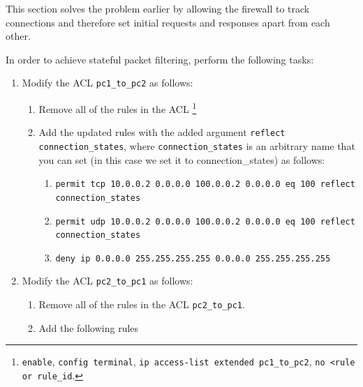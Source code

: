 \documentclass[pdftex,12pt,a4paper]{article}
\begin{document}
            This section solves the problem earlier by allowing the firewall to
            track connections and therefore set initial requests and responses
            apart from each other.

            In order to achieve stateful packet filtering, perform the
            following tasks:
            \begin{enumerate}
                \item Modify the ACL \texttt{pc1\_to\_pc2} as follows:
                    \begin{enumerate}
                        \item Remove all of the rules in the ACL
                            \footnote{\texttt{enable}, \texttt{config
                                terminal}, \texttt{ip access-list extended
                            pc1\_to\_pc2}, \texttt{no <rule or rule\_id}.}
                        \item Add the updated rules with the added argument
                            \texttt{reflect connection\_states}, where
                            \texttt{connection\_states} is an arbitrary name
                            that you can set (in this case we set it to
                            connection\_states) as follows:
                            \begin{enumerate}
                                \item  \texttt{permit tcp 10.0.0.2 0.0.0.0
                                    100.0.0.2 0.0.0.0 eq 100 reflect
                                    connection\_states}
                                \item  \texttt{permit udp 10.0.0.2 0.0.0.0
                                    100.0.0.2 0.0.0.0 eq 100 reflect
                                    connection\_states}
                                \item  \texttt{deny ip 0.0.0.0 255.255.255.255
                                    0.0.0.0 255.255.255.255}
                            \end{enumerate}
                    \end{enumerate}
                \item Modify the ACL \texttt{pc2\_to\_pc1} as follows:
                    \begin{enumerate}
                        \item Remove all of the rules in the ACL
                            \texttt{pc2\_to\_pc1}.
                        \item Add the following rules

\end{enumerate}
\end{enumerate}
\end{document}

